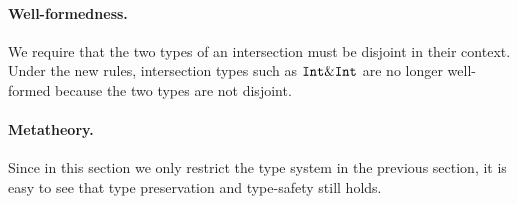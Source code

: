 
\paragraph{Well-formedness.}
We require that the two types of an intersection must be disjoint in their
context. Under the new rules, intersection types such as $\texttt{Int} \& \texttt{Int}$
are no longer well-formed because the two types are not disjoint.

\paragraph{Metatheory.}
Since in this section we only restrict the type system
in the previous section, it is easy to see that type preservation and
type-safety still holds.




%


%

